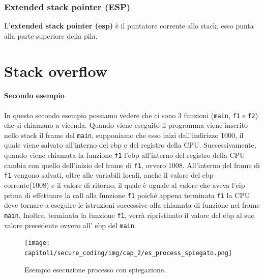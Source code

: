 \subsubsection{Extended stack pointer (ESP)}

L'\textbf{extended stack pointer (esp)} è il puntatore corrente allo stack, esso
punta alla parte superiore della pila.

\section{Stack overflow}

\paragraph{Secondo esempio}
In questo secondo esempio possiamo vedere che ci sono 3 funzioni
(\verb|main|, \verb|f1| e \verb|f2|) che si chiamano a vicenda.
Quando viene eseguito il programma viene inserito nello stack il frame del \verb|main|,
supponiamo che esso inizi dall'indirizzo 1000, il quale viene salvato all'interno
del ebp e del registro della CPU. Successivamente, quando viene chiamata la
funzione \verb|f1| l'ebp all'interno del registro della CPU cambia con quello
dell'inizio del frame di \verb|f1|, ovvero 1008.
All'interno del frame di \verb|f1| vengono salvati, oltre alle variabili locali,
anche il valore del ebp corrente(1008) e il valore di ritorno, il quale è uguale
al valore che aveva l'eip prima di effettuare la call alla funzione \verb|f1| poiché appena terminata \verb|f1| la CPU deve tornare a
eseguire le istruzioni successive alla chiamata di funzione nel frame \verb|main|. Inoltre, terminata la funzione \verb|f1|, verrà ripristinato il valore del ebp al suo valore precedente ovvero all' ebp del \verb|main|.

\begin{figure}[H]
    \centering
    \texttt{[image: capitoli/secure\_coding/img/cap\_2/es\_process\_spiegato.png]}
    \caption{Esempio esecuzione processo con spiegazione.}\label{fig:es_esec_processo2}
\end{figure}


